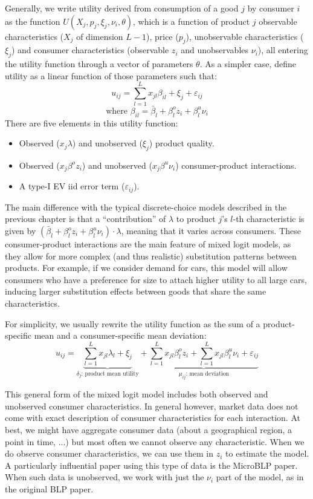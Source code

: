 Generally, we write utility derived from consumption of a good $j$ by consumer $i$ as the function $U(X_j, p_j, \xi_j, \nu_i, \theta)$, which is a function of product $j$ observable characteristics ($X_j$ of dimension $L-1$), price ($p_j$), unobservable characteristics ($\xi_j$) and consumer characteristics (observable $z_i$ and unobservables $\nu_i$), all entering the utility function through a vector of parameters $\theta$. As a simpler case, define utility as a linear function of those parameters such that: $$u_{ij} = \sum_{l=1}^L x_{jl}\beta_{il} + \xi_j + \varepsilon_{ij} $$ $$ \text{where } \beta_{il} = \bar\beta_l + \beta_l^o z_i + \beta_l^u \nu_i $$  There are five elements in this utility function:\begin{itemize}
\item Observed ($x_j\lambda$) and unobserved ($\xi_j$) product quality.
\item Observed ($x_{j}\beta^o z_i$) and unobserved ($x_{j}\beta^u \nu_i$) consumer-product interactions.
\item A type-I EV iid error term ($\varepsilon_{ij}$).
\end{itemize} 
The main difference with the typical discrete-choice models described in the previous chapter is that a ``contribution'' of $\lambda$ to product $j$'s $l$-th characteristic is given by $(\bar\beta_l + \beta_l^o z_i + \beta_l^u \nu_i)\cdot\lambda$, meaning that it varies across consumers. These consumer-product interactions are the main feature of mixed logit models, as they allow for more complex (and thus realistic) substitution patterns between products. For example, if we consider demand for cars, this model will allow consumers who have a preference for size to attach higher utility to all large cars, inducing larger substitution effects between goods that share the same characteristics.

For simplicity, we usually rewrite the utility function as the sum of a product-specific mean and a consumer-specific mean deviation: $$u_{ij} = \underbrace{\sum_{l=1}^L x_{jl}\lambda_l + \xi_j}_{\delta_j\text{: product mean utility}} + \underbrace{\sum_{l=1}^L x_{jl}\beta_l^o z_i + \sum_{l=1}^L x_{jl}\beta_l^u \nu_i  + \varepsilon_{ij}}_{\mu_{ij}\text{: mean deviation}} $$

This general form of the mixed logit model includes both observed and unobserved consumer characteristics. In general however, market data does not come with exact description of consumer characteristics for each interaction. At best, we might have aggregate consumer data (about a geographical region, a point in time, ...) but most often we cannot observe any characteristic. When we do observe consumer characteristics, we can use them in $z_i$ to estimate the model. A particularly influential paper using this type of data is the MicroBLP paper. When such data is unobserved, we work with just the $\nu_i$ part of the model, as in the original BLP paper.

